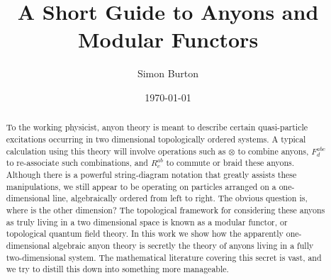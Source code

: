 \documentclass[aps, tightenlines, letterpaper, onecolumn, superscriptaddress, notitlepage, 11pt, groupedaddress]{revtex4-1}
\begin{document}
\title{A Short Guide to Anyons and Modular Functors}

\author{Simon Burton}

\date{\today}

\begin{abstract}
To the working physicist, anyon theory is meant to describe
certain quasi-particle excitations occurring in two dimensional
topologically ordered systems. 
A typical calculation using this theory will involve operations
such as $\otimes$ to combine anyons, 
$F^{abc}_{d}$ to re-associate such combinations,
and $R^{ab}_c$ to commute or braid these anyons. 
Although there is a powerful string-diagram notation that greatly assists these
manipulations, we still appear to be operating on particles
arranged on a one-dimensional line, algebraically ordered from left to right.
The obvious question is, where is the other dimension?
The topological framework for considering these anyons as truly living in a
two dimensional space is known as a modular functor, or topological
quantum field theory. 
In this work we show how the apparently one-dimensional algebraic anyon theory
is secretly the theory of anyons living in a fully two-dimensional system.
The mathematical literature covering this secret is vast, 
and we try to distill this down into something more manageable.
\end{abstract}

\maketitle
\end{document}
